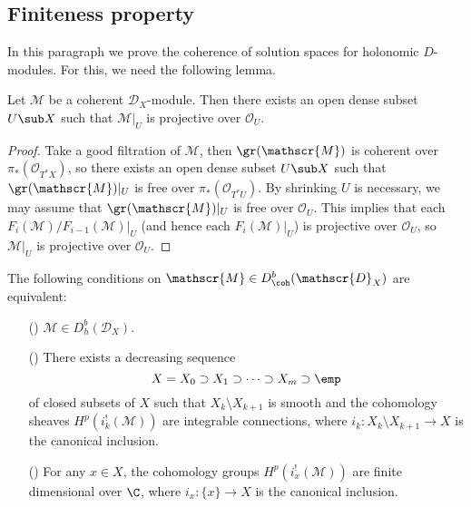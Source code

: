\subsection{Finiteness property}
In this paragraph we prove the coherence of solution spaces for holonomic $D$-modules. For this, we need the following lemma.
\begin{lemma}\label{D-module coherent projective locus open dense}
Let $\mathscr{M}$ be a coherent $\mathscr{D}_X$-module. Then there exists an open dense subset $U\sub X$ such that $\mathscr{M}|_U$ is projective over $\mathscr{O}_U$.
\end{lemma}
\begin{proof}
Take a good filtration of $\mathscr{M}$, then $\gr(\mathscr{M})$ is coherent over $\pi_*(\mathscr{O}_{T^*X})$, so there exists an open dense subset $U\sub X$ such that $\gr(\mathscr{M})|_U$ is free over $\pi_*(\mathscr{O}_{T^*U})$. By shrinking $U$ is necessary, we may assume that $\gr(\mathscr{M})|_U$ is free over $\mathscr{O}_U$. This implies that each $F_i(\mathscr{M})/F_{i-1}(\mathscr{M})|_U$ (and hence each $F_i(\mathscr{M})|_U$) is projective over $\mathscr{O}_U$, so $\mathscr{M}|_U$ is projective over $\mathscr{O}_U$.
\end{proof}

\begin{theorem}\label{D-module holonomic iff integrable connection straitification}
The following conditions on $\mathscr{M}\in D^b_{\coh}(\mathscr{D}_X)$ are equivalent:
\begin{enumerate}
    \item[(\rmnum{1})] $\mathscr{M}\in D^b_h(\mathscr{D}_X)$.
    \item[(\rmnum{2})] There exists a decreasing sequence
    \[X=X_0\supset X_1\supset\cdots\supset X_m\supset\emp\]
    of closed subsets of $X$ such that $X_k\setminus X_{k+1}$ is smooth and the cohomology sheaves $H^p(i_k^!(\mathscr{M}))$ are integrable connections, where $i_k:X_k\setminus X_{k+1}\to X$ is the canonical inclusion.
    \item[(\rmnum{3})] For any $x\in X$, the cohomology groups $H^p(i_x^!(\mathscr{M}))$ are finite dimensional over $\C$, where $i_x:\{x\}\to X$ is the canonical inclusion.
\end{enumerate}
\end{theorem}

